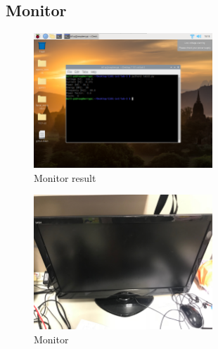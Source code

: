 \documentclass[12pt, a4paper, onside]{article}
\begin{document}
\clearpage

\subsection{Monitor}
\begin{figure}[h]
  \centering
  \includegraphics[width=0.6\textwidth]{img/5_res_monitor}
  \caption{Monitor result}
\end{figure}
\begin{figure}[h]
  \centering
  \includegraphics[width=0.6\textwidth]{img/5_pic_monitor}
  \caption{Monitor}
\end{figure}

\clearpage
\end{document}
